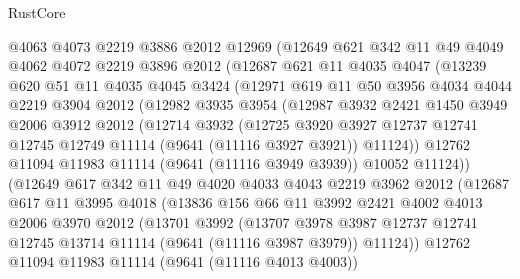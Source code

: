 \begin{lexlean}{RustCore}
\begin{coremodule}
      @4063
      @4073
      @2219
      @3886
      @2012
      @12969
      (@12649
        @621
        @342
        @11
        @49
        @4049
        @4062
        @4072
        @2219
        @3896
        @2012
        (@12687
          @621
          @11
          @4035
          @4047
          (@13239
            @620
            @51
            @11
            @4035
            @4045
            @3424
            (@12971
              @619
              @11
              @50
              @3956
              @4034
              @4044
              @2219
              @3904
              @2012
              (@12982
                @3935
                @3954
                (@12987
                  @3932
                  @2421
                  @1450
                  @3949
                  @2006
                  @3912
                  @2012
                  (@12714
                    @3932
                    (@12725
                      @3920
                      @3927
                      @12737
                      @12741
                      @12745
                      @12749
                      @11114
                      (@9641 (@11116 @3927 @3921))
                      @11124))
                  @12762
                  @11094
                  @11983
                  @11114
                  (@9641 (@11116 @3949 @3939))
                  @10052
                  @11124))
              (@12649
                @617
                @342
                @11
                @49
                @4020
                @4033
                @4043
                @2219
                @3962
                @2012
                (@12687
                  @617
                  @11
                  @3995
                  @4018
                  (@13836
                    @156
                    @66
                    @11
                    @3992
                    @2421
                    @4002
                    @4013
                    @2006
                    @3970
                    @2012
                    (@13701
                      @3992
                      (@13707
                        @3978
                        @3987
                        @12737
                        @12741
                        @12745
                        @13714
                        @11114
                        (@9641 (@11116 @3987 @3979))
                        @11124))
                    @12762
                    @11094
                    @11983
                    @11114
                    (@9641 (@11116 @4013 @4003))

\end{coremodule}
\end{lexlean}
